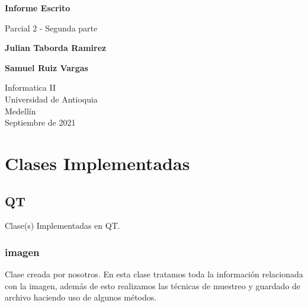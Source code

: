 \documentclass{article}
\begin{document}
\begin{titlepage}
    \begin{center}
        \vspace*{1cm}
            
        \Huge
        \textbf{Informe Escrito}
            
        \vspace{0.5cm}
        \LARGE
        Parcial 2 - Segunda parte
            
        \vspace{1.5cm}
            
        \textbf{Julian Taborda Ramirez}
        
        \vspace{0.5cm}
        
        \textbf{Samuel Ruiz Vargas}
            
        \vfill
            
        \vspace{0.8cm}
            
        \Large
        Informatica II\\
        Universidad de Antioquia\\
        Medellín\\
        Septiembre de 2021
            
    \end{center}
\end{titlepage}

\tableofcontents
\vspace*{1.2cm}

\newpage

\section{Clases Implementadas}
\label{clases}

    \begin{flushleft}
    \subsection{QT}
    Clase(s) Implementadas en QT.
    \end{flushleft}
    
    \begin{flushleft}
    \subsubsection{imagen}
    Clase creada por nosotros. En esta clase tratamos toda la información relacionada con la imagen, además de esto realizamos las técnicas de muestreo y guardado de archivo haciendo uso de algunos métodos.
    \end{flushleft}
    
\end{document}
